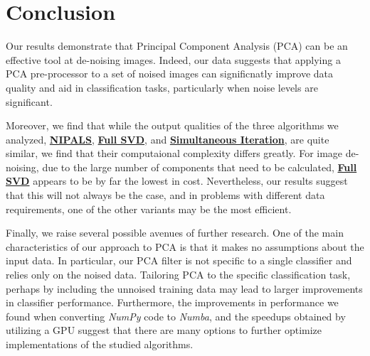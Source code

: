 \documentclass[12pt]{article}
\begin{document}
\pagebreak
\section{Conclusion}\label{7}

   Our results demonstrate that Principal Component Analysis (PCA) can be an effective tool at de-noising images. Indeed, our data suggests that applying a PCA pre-processor to a set of noised images can significnatly improve data quality and aid in classification tasks, particularly when noise levels are significant. 
    
    Moreover, we find that while the output qualities of the three algorithms we analyzed, \textbf{\hyperref[3.1]{NIPALS}}, \textbf{\hyperref[3.2]{Full SVD}}, and \textbf{\hyperref[3.3]{Simultaneous Iteration}}, are quite similar, we find that their computaional complexity differs greatly. For image de-noising, due to the large number of components that need to be calculated, \textbf{\hyperref[3.2]{Full SVD}} appears to be by far the lowest in cost. Nevertheless, our results suggest that this will not always be the case, and in problems with different data requirements, one of the other variants may be the most efficient. 
    
    Finally, we raise several possible avenues of further research. One of the main characteristics of our approach to PCA is that it makes no assumptions about the input data. In particular, our PCA filter is not specific to a single classifier and relies only on the noised data. Tailoring PCA to the specific classification task, perhaps by including the unnoised training data may lead to larger improvements in classifier performance. Furthermore, the improvements in performance we found when converting \textit{NumPy} code to \textit{Numba}, and the speedups obtained by utilizing a GPU suggest that there are many options to further optimize implementations of the studied algorithms.


\pagebreak
\printbibliography
\end{document}
